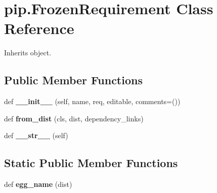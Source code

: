 \hypertarget{classpip_1_1_frozen_requirement}{}\section{pip.\+Frozen\+Requirement Class Reference}
\label{classpip_1_1_frozen_requirement}


Inherits object.

\subsection*{Public Member Functions}
\begin{DoxyCompactItemize}
\item 
\mbox{\label{classpip_1_1_frozen_requirement_a97a84323aaa3c2dde24b79106ec77905}} 
def {\bfseries \+\_\+\+\_\+init\+\_\+\+\_\+} (self, name, req, editable, comments=())
\item 
\mbox{\label{classpip_1_1_frozen_requirement_a4381271c07fa101e60fd00b4f69a7682}} 
def {\bfseries from\+\_\+dist} (cls, dist, dependency\+\_\+links)
\item 
\mbox{\label{classpip_1_1_frozen_requirement_a51f1fdee9ac338e7d20c16cdb2e120ba}} 
def {\bfseries \+\_\+\+\_\+str\+\_\+\+\_\+} (self)
\end{DoxyCompactItemize}
\subsection*{Static Public Member Functions}
\begin{DoxyCompactItemize}
\item 
\mbox{\label{classpip_1_1_frozen_requirement_ad041c5eb6fdff2b08966c0766afb57ad}} 
def {\bfseries egg\+\_\+name} (dist)
\end{DoxyCompactItemize}
